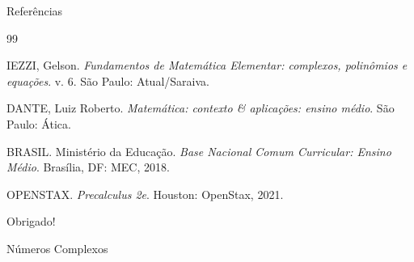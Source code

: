\documentclass[aspectratio=169]{beamer}
\newcommand{\FonteDestaque}{\sffamily\mdseries}
\newcommand{\FonteDestaque}{\UbuntuFont\mdseries}
\begin{document}
\begin{frame}{Referências}
\small

\begin{thebibliography}{99}

IEZZI, Gelson.
\textit{Fundamentos de Matemática Elementar: complexos, polinômios e equações}.
v. 6. São Paulo: Atual/Saraiva.

DANTE, Luiz Roberto.
\textit{Matemática: contexto \& aplicações: ensino médio}.
São Paulo: Ática.

BRASIL. Ministério da Educação.
\textit{Base Nacional Comum Curricular: Ensino Médio}.
Brasília, DF: MEC, 2018.

OPENSTAX.
\textit{Precalculus 2e}.
Houston: OpenStax, 2021.

\end{thebibliography}

\end{frame}

\begin{frame}
\centering
\vfill
{\FonteDestaque\LARGE Obrigado!}

\vspace{1em}
{\large Números Complexos}
\vfill
\end{frame}
\end{document}
